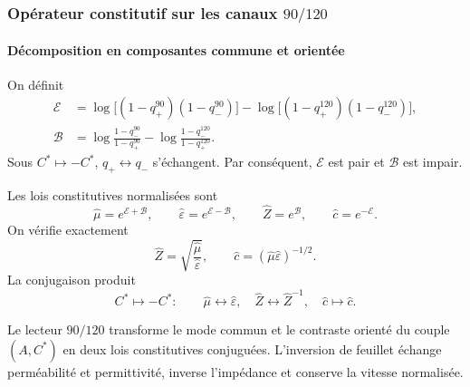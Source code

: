 \subsubsection{Opérateur constitutif sur les canaux \(90/120\)}

\paragraph{Décomposition en composantes commune et orientée}

On définit
\begin{align}
\mathcal E
&=\log\bigl[(1-q_+^{90})(1-q_-^{90})\bigr]
-\log\bigl[(1-q_+^{120})(1-q_-^{120})\bigr],
\label{eq:Ecommon}\\
\mathcal B
&=\log\frac{1-q_-^{90}}{1-q_+^{90}}
-\log\frac{1-q_-^{120}}{1-q_+^{120}}.
\label{eq:Borient}
\end{align}
Sous \(C^*\mapsto-C^*\), \(q_+\leftrightarrow q_-\) s'échangent. Par
conséquent, \(\mathcal E\) est pair et \(\mathcal B\) est impair.

Les lois constitutives normalisées sont
\begin{equation}
\widehat\mu=e^{\mathcal E+\mathcal B},
\qquad
\widehat\varepsilon=e^{\mathcal E-\mathcal B},
\qquad
\widehat Z=e^{\mathcal B},
\qquad
\widehat c=e^{-\mathcal E}.
\label{eq:constitutives}
\end{equation}
On vérifie exactement
\begin{equation}
\widehat Z=\sqrt{\frac{\widehat\mu}{\widehat\varepsilon}},
\qquad
\widehat c=(\widehat\mu\widehat\varepsilon)^{-1/2}.
\label{eq:constitutive-identities}
\end{equation}
La conjugaison produit
\begin{equation}
C^*\mapsto-C^*:\qquad
\widehat\mu\leftrightarrow\widehat\varepsilon,
\quad
\widehat Z\leftrightarrow\widehat Z^{-1},
\quad
\widehat c\mapsto\widehat c.
\label{eq:EM-conjugation}
\end{equation}

\begin{theorem}
Le lecteur \(90/120\) transforme le mode commun et le contraste orienté du
couple \((A,C^*)\) en deux lois constitutives conjuguées. L'inversion de feuillet
échange perméabilité et permittivité, inverse l'impédance et conserve la
vitesse normalisée.
\end{theorem}

